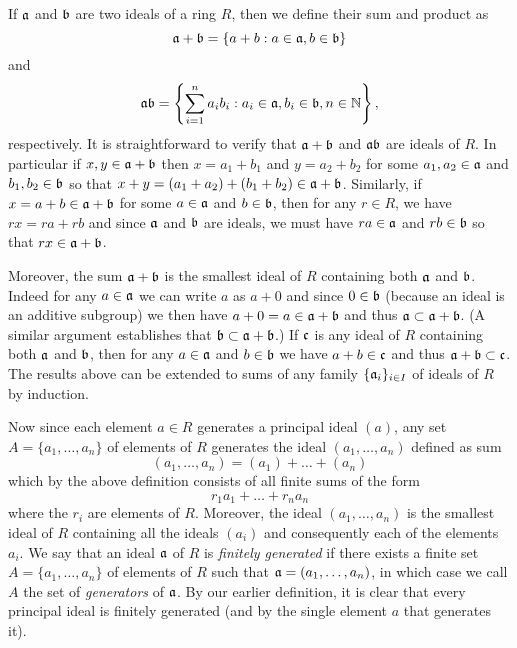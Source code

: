If \(\mathfrak{a}\) and \(\mathfrak{b}\) are two ideals of a ring \(R\), then we define
their sum and product as
\[
    \mathfrak{a} + \mathfrak{b} = \{a + b : a \in \mathfrak{a}, b \in \mathfrak{b}\}
\]
and
\[
    \mathfrak{ab} = \left\{\sum_{i=1}^{n} a_ib_i : a_i \in \mathfrak{a}, b_i \in \mathfrak{b}, n \in \mathbb{N}\right\},
\]
respectively. It is straightforward to verify that \(\mathfrak{a} + \mathfrak{b}\) and
\(\mathfrak{ab}\) are ideals of \(R\). In particular if \(x, y \in \mathfrak{a} +
\mathfrak{b}\) then \(x = a_1 + b_1\) and \(y = a_2 + b_2\) for some \(a_1, a_2 \in
\mathfrak{a}\) and \(b_1, b_2 \in \mathfrak{b}\) so that \(x + y = (a_1 + a_2) + (b_1 +
b_2) \in \mathfrak{a} + \mathfrak{b}\). Similarly, if \(x = a + b \in \mathfrak{a} + \mathfrak{b}\)
for some \(a \in \mathfrak{a}\) and \(b \in \mathfrak{b}\), then for any \(r \in R\), we
have \(rx = ra + rb\) and since \(\mathfrak{a}\) and \(\mathfrak{b}\) are ideals, we must
have \(ra \in \mathfrak{a}\) and \(rb \in \mathfrak{b}\) so that \(rx \in \mathfrak{a} +
\mathfrak{b}\).

Moreover, the sum \(\mathfrak{a} + \mathfrak{b}\) is the smallest ideal of \(R\)
containing both \(\mathfrak{a}\) and \(\mathfrak{b}\). Indeed for any \(a \in \mathfrak{a}\) we
can write \(a\) as \(a + 0\) and since \(0 \in \mathfrak{b}\) (because an ideal is an
additive subgroup) we then have \(a + 0 = a \in \mathfrak{a} + \mathfrak{b}\) and thus
\(\mathfrak{a} \subset \mathfrak{a} + \mathfrak{b}\). (A similar argument establishes that
\(\mathfrak{b} \subset \mathfrak{a} + \mathfrak{b}\).) If \(\mathfrak{c}\) is any ideal of \(R\)
containing both \(\mathfrak{a}\) and \(\mathfrak{b}\), then for any \(a \in \mathfrak{a}\) and
\(b \in \mathfrak{b}\) we have \(a + b \in \mathfrak{c}\) and thus \(\mathfrak{a} + \mathfrak{b}
\subset \mathfrak{c}\). The results above can be extended to sums of any family
\(\{\mathfrak{a}_i\}_{i \in I}\) of ideals of \(R\) by induction.

Now since each element \(a \in R\) generates a principal ideal \((a)\), any set
\(A = \{a_1, \dots, a_n\}\) of elements of \(R\) generates the ideal \((a_1,
\dots, a_n)\) defined as sum
\[
    (a_1, \dots, a_n) = (a_1) + \dots + (a_n)
\]
which by the above definition consists of all finite sums of the form
\[
    r_1a_1 + \dots + r_na_n
\]
where the \(r_i\) are elements of \(R\). Moreover, the ideal \((a_1, \dots,
a_n)\) is the smallest ideal of \(R\) containing all the ideals \((a_i)\) and
consequently each of the elements \(a_i\). We say that an ideal \(\mathfrak{a}\) of
\(R\) is \emph{finitely generated} if there exists a finite set \(A = \{a_1,
\dots, a_n\}\) of elements of \(R\) such that \(\mathfrak{a} = (a_1, \dots, a_n)\),
in which case we call \(A\) the set of \emph{generators} of \(\mathfrak{a}\). By our
earlier definition, it is clear that every principal ideal is finitely generated
(and by the single element \(a\) that generates it).

